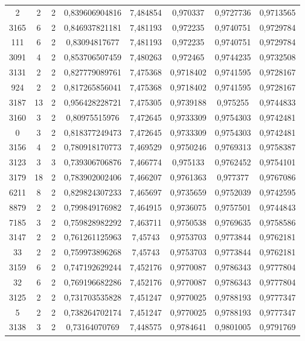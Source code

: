 \begin{longtable}{|c|c|c|c|c|c|c|c|}
2 & 2 & 2 & 0,839606904816 & 7,484854 & 0,970337 & 0,9727736 & 0,9713565 \\
3165 & 6 & 2 & 0,846937821181 & 7,481193 & 0,972235 & 0,9740751 & 0,9729784 \\
111 & 6 & 2 & 0,83094817677 & 7,481193 & 0,972235 & 0,9740751 & 0,9729784 \\
3091 & 4 & 2 & 0,853706507459 & 7,480263 & 0,972465 & 0,9744235 & 0,9732508 \\
3131 & 2 & 2 & 0,827779089761 & 7,475368 & 0,9718402 & 0,9741595 & 0,9728167 \\
924 & 2 & 2 & 0,817265856041 & 7,475368 & 0,9718402 & 0,9741595 & 0,9728167 \\
3187 & 13 & 2 & 0,956428228721 & 7,475305 & 0,9739188 & 0,975255 & 0,9744833 \\
3160 & 3 & 2 & 0,80975515976 & 7,472645 & 0,9733309 & 0,9754303 & 0,9742481 \\
0 & 3 & 2 & 0,818377249473 & 7,472645 & 0,9733309 & 0,9754303 & 0,9742481 \\
3156 & 4 & 2 & 0,780918170773 & 7,469529 & 0,9750246 & 0,9769313 & 0,9758387 \\
3123 & 3 & 3 & 0,739306706876 & 7,466774 & 0,975133 & 0,9762452 & 0,9754101 \\
3179 & 18 & 2 & 0,783902002406 & 7,466207 & 0,9761363 & 0,977377 & 0,9767086 \\
6211 & 8 & 2 & 0,829824307233 & 7,465697 & 0,9735659 & 0,9752039 & 0,9742595 \\
8879 & 2 & 2 & 0,799849176982 & 7,464915 & 0,9736075 & 0,9757501 & 0,9744843 \\
7185 & 3 & 2 & 0,759828982292 & 7,463711 & 0,9750538 & 0,9769635 & 0,9758586 \\
3147 & 2 & 2 & 0,761261125963 & 7,45743 & 0,9753703 & 0,9773844 & 0,9762181 \\
33 & 2 & 2 & 0,759973896268 & 7,45743 & 0,9753703 & 0,9773844 & 0,9762181 \\
3159 & 6 & 2 & 0,747192629244 & 7,452176 & 0,9770087 & 0,9786343 & 0,9777804 \\
32 & 6 & 2 & 0,769196682286 & 7,452176 & 0,9770087 & 0,9786343 & 0,9777804 \\
3125 & 2 & 2 & 0,731703535828 & 7,451247 & 0,9770025 & 0,9788193 & 0,9777347 \\
5 & 2 & 2 & 0,738264702174 & 7,451247 & 0,9770025 & 0,9788193 & 0,9777347 \\
3138 & 3 & 2 & 0,73164070769 & 7,448575 & 0,9784641 & 0,9801005 & 0,9791769 \\

\end{longtable}
